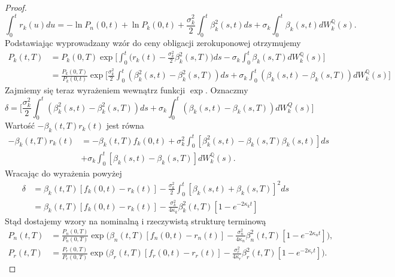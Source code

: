 \documentclass{mini}
\theoremstyle{mythstyle}
\begin{document}
\begin{proof}
\begin{equation}
		\int_{0}^{t} r_k(u) du = -\ln P_n(0,t) + \ln P_k(0,t) + \frac{\sigma_k^2}{2} \int_{0}^{t} \beta^2_k(s,t) ds + \sigma_k \int_{0}^{t} \beta_k(s,t) dW_k^\mathbb{Q}(s).
	\end{equation}
	Podstawiając wyprowadzany wzór do ceny obligacji zerokuponowej otrzymujemy
	\begin{align}
		P_k(t,T) &= P_k(0,T) \exp\bigg[ \int_{0}^{t}\bigg( r_k(t) - \frac{\sigma_k^2}{2}\beta_k^2(s,T)\bigg)ds - \sigma_k\int_{0}^{t} \beta_k(s,T)dW_k^\mathbb{Q}(s)  \bigg] \\
		&= \frac{P_k(0,T)}{P_k(0,t)} \exp \bigg[ \frac{\sigma_k^2}{2} \int_{0}^{t} (\beta_k^2(s,t) - \beta_k^2(s,T))ds + \sigma_k\int_{0}^{t} (\beta_k(s,t) - \beta_k(s,T)) dW_k^\mathbb{Q}(s) \bigg]
	\end{align}
	Zajmiemy się teraz wyrażeniem wewnątrz funkcji $\exp$. Oznaczmy
	\begin{equation}
		\delta = \bigg[ \frac{\sigma_k^2}{2} \int_{0}^{t} (\beta_k^2(s,t) - \beta_k^2(s,T))ds + \sigma_k\int_{0}^{t} (\beta_k(s,t) - \beta_k(s,T)) dW_k^Q(s) \bigg]
	\end{equation}
	Wartość $-\beta_k(t,T)r_k(t)$ jest równa
	\begin{align}
		-\beta_k(t,T)r_k(t) &= -\beta_k(t,T)f_k(0,t) + \sigma_k^2\int_{0}^{t} [\beta_k^2(s,t) - \beta_k(s,T)\beta_k(s,t)]ds \\ &+ \sigma_k\int_{0}^{t} [\beta_k(s,t) - \beta_k(s,T)]dW_k^\mathbb{Q}(s).
	\end{align}
	Wracając do wyrażenia powyżej
	\begin{align}
		\delta &= \beta_k(t,T)[f_k(0,t) - r_k(t)]-\frac{\sigma_k^2}{2}\int_{0}^{t}[\beta_k(s,t) + \beta_k(s,T)]^2ds \\
		&= \beta_k(t,T)[f_k(0,t) - r_k(t)]-\frac{\sigma_k^2}{4\kappa_k}\beta_k^2(t,T)[1-e^{-2\kappa_kt}] 
	\end{align}
	Stąd dostajemy wzory na nominalną i rzeczywistą strukturę terminową
	\begin{align}
		P_n(t, T) &= \frac{P_n(0,T)}{P_n(0,T)} \exp\bigg( \beta_n (t, T) [f_n(0,t) - r_n(t) ]  - \frac{\sigma_n^2}{4\kappa_n} \beta_n^2(t,T) [1 - e^{-2\kappa_n t}] \bigg),\\
		P_r(t, T) &= \frac{P_r(0,T)}{P_r(0,T)} \exp\bigg( \beta_r (t, T) [f_r(0,t) - r_r(t) ]  - \frac{\sigma_r^2}{4\kappa_r} \beta_r^2(t,T) [1 - e^{-2\kappa_rt}] \bigg).
	\end{align}
\end{proof}
	
	
	
\end{document}
